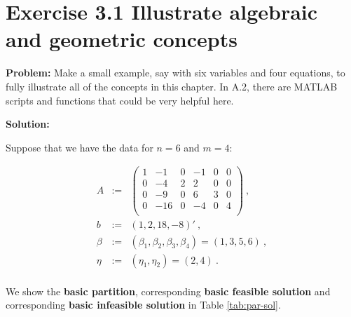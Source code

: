 
\section{Exercise 3.1 Illustrate algebraic and geometric concepts}
\textbf{Problem:} Make a small example, say with six variables and four equations, to fully illustrate all of the concepts in this chapter. In A.2, there are MATLAB scripts and functions that could be very helpful here.

\textbf{Solution:}

Suppose that we have the data for $n=6$ and $m=4$:

\[
\begin{array}{ccl}
A & := & \left(
  \begin{array}{cccccc}
    1 & -1 & 0 & -1 & 0 & 0 \\
    0 & -4 & 2 & 2 & 0 & 0 \\
    0 & -9 & 0 & 6 & 3 & 0 \\
    0 & -16 & 0 & -4 & 0 & 4 \\
  \end{array}
\right)~, \\
b & := & (1,2,18,-8)'~,\\
\beta & := & (\beta_1, \beta_2, \beta_3, \beta_4) = (1,3,5,6)~, \\
\eta & := & (\eta_1, \eta_2) = (2,4)~. \\
\end{array}
\]


We show the \textbf{basic partition}, corresponding \textbf{basic feasible solution} and corresponding \textbf{basic infeasible solution} in Table \ref{tab:par-sol}.

